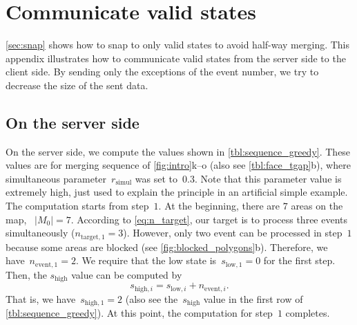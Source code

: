 \documentclass[twocolumn]{svjour3}          %
\begin{document}


\bigskip


\section{Communicate valid states}
\label{appx:communicate_valid_states}

\sect\ref{sec:snap} shows how to snap to only valid states 
to avoid half-way merging.
This appendix illustrates how to communicate valid states 
from the server side to the client side.
By sending only the exceptions of the event number, 
we try to decrease the size of the sent data.



\subsection{On the server side}
\label{sec:communicate_server}

On the server side, 
we compute the values shown in \tabl\ref{tbl:sequence_greedy}.
These values are for merging sequence of \fig\ref{fig:intro}k--o 
(also see \tabl\ref{tbl:face_tgap}b),
where simultaneous parameter~$r_\mathrm{simul}$ was set to~$0.3$.
Note that this parameter value is extremely high, 
just used to explain the principle in an artificial simple example.
The computation starts from step~$1$.
At the beginning, there are $7$ areas on the map, \ie~$|M_0| = 7$.
According to \eq\ref{eq:n_target},
our target is to process three events simultaneously ($n_{\mathrm{target},1} = 3$).
However, only two event can be processed in step~$1$ 
because some areas are blocked
(see \fig\ref{fig:blocked_polygons}b).
Therefore, we have~$n_{\mathrm{event},1} = 2$.
We require that the low state is~$s_{\mathrm{low},1} = 0$ for the first step.
Then, the $s_\mathrm{high}$ value can be computed by
\begin{equation}
\label{eq:state_high}
s_{\mathrm{high},i} = s_{\mathrm{low},i} + n_{\mathrm{event},i}.
\end{equation}
That is, we have~$s_{\mathrm{high},1}=2$
(also see the~$s_\mathrm{high}$ value in the first row of \tabl\ref{tbl:sequence_greedy}).
At this point, the computation for step~$1$ completes.
\end{document}
